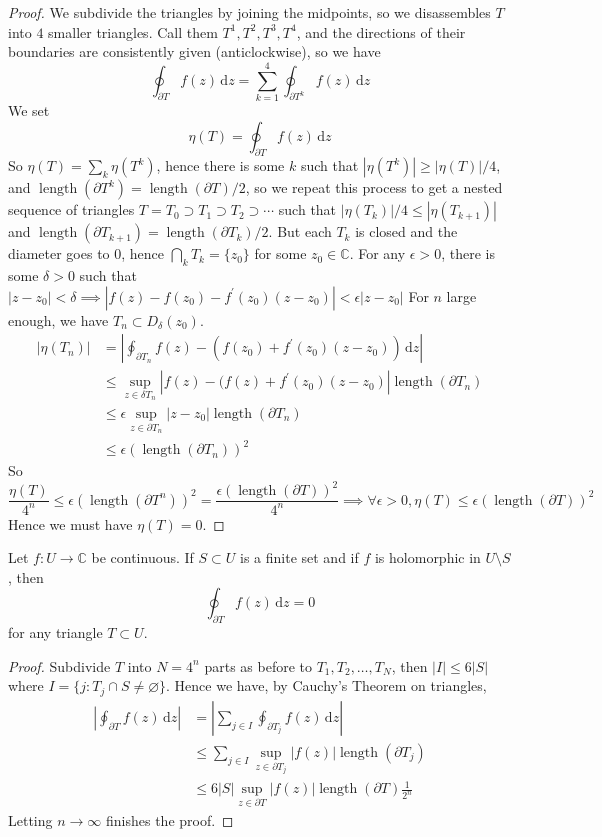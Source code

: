 \begin{proof}
    We subdivide the triangles by joining the midpoints, so we disassembles $T$ into $4$ smaller triangles.
    Call them $T^1,T^2,T^3,T^4$, and the directions of their boundaries are consistently given (anticlockwise), so we have
    $$\oint_{\partial T}f(z)\,\mathrm dz=\sum_{k=1}^4\oint_{\partial T^k}f(z)\,\mathrm dz$$
    We set
    $$\eta(T)=\oint_{\partial T}f(z)\,\mathrm dz$$
    So $\eta(T)=\sum_{k}\eta(T^k)$, hence there is some $k$ such that $|\eta(T^k)|\ge|\eta(T)|/4$, and $\operatorname{length}(\partial T^k)=\operatorname{length}(\partial T)/2$, so we repeat this process to get a nested sequence of triangles $T=T_0\supset T_1\supset T_2\supset\cdots$ such that $|\eta(T_k)|/4\le|\eta(T_{k+1})|$ and $\operatorname{length}(\partial T_{k+1})=\operatorname{length}(\partial T_k)/2$.
    But each $T_k$ is closed and the diameter goes to $0$, hence $\bigcap_kT_k=\{z_0\}$ for some $z_0\in\mathbb C$.
    For any $\epsilon>0$, there is some $\delta>0$ such that $|z-z_0|<\delta\implies |f(z)-f(z_0)-f^\prime(z_0)(z-z_0)|<\epsilon|z-z_0|$
    For $n$ large enough, we have $T_n\subset D_\delta(z_0)$.
    \begin{align*}
        |\eta(T_n)|&=\left|\oint_{\partial T_n}f(z)-(f(z_0)+f^\prime(z_0)(z-z_0))\,\mathrm dz\right|\\
        &\le\sup_{z\in \delta T_n}|f(z)-(f(z)+f^\prime(z_0)(z-z_0)|\operatorname{length}(\partial T_n)\\
        &\le\epsilon\sup_{z\in\partial T_n}|z-z_0|\operatorname{length}(\partial T_n)\\
        &\le\epsilon(\operatorname{length}(\partial T_n))^2
    \end{align*}
    So
    $$\frac{\eta(T)}{4^n}\le\epsilon(\operatorname{length}(\partial T^n))^2=\frac{\epsilon(\operatorname{length}(\partial T))^2}{4^n}\implies\forall\epsilon>0,\eta(T)\le \epsilon(\operatorname{length}(\partial T))^2$$
    Hence we must have $\eta(T)=0$.
\end{proof}
\begin{theorem}
    Let $f:U\to\mathbb C$ be continuous.
    If $S\subset U$ is a finite set and if $f$ is holomorphic in $U\setminus S$, then
    $$\oint_{\partial T}f(z)\,\mathrm dz=0$$
    for any triangle $T\subset U$.
\end{theorem}
\begin{proof}
    Subdivide $T$ into $N=4^n$ parts as before to $T_1,T_2,\ldots,T_N$, then $|I|\le 6|S|$ where $I=\{j:T_j\cap S\neq\varnothing\}$.
    Hence we have, by Cauchy's Theorem on triangles,
    \begin{align*}
        \left|\oint_{\partial T}f(z)\,\mathrm dz\right|&=\left|\sum_{j\in I}\oint_{\partial T_j}f(z)\,\mathrm dz\right|\\
        &\le\sum_{j\in I}\sup_{z\in\partial T_j}|f(z)|\operatorname{length}(\partial T_j)\\
        &\le 6|S|\sup_{z\in\partial T}|f(z)|\operatorname{length}(\partial T)\frac{1}{2^n}
    \end{align*}
    Letting $n\to\infty$ finishes the proof.
\end{proof}
